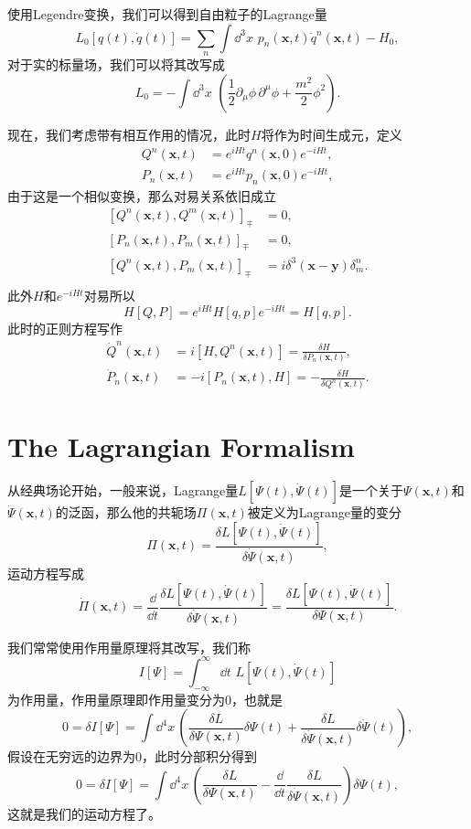 \documentclass[10pt]{extbook}
\theoremstyle{plain}%
\begin{document}
使用Legendre变换，我们可以得到自由粒子的Lagrange量
\[
	L_0[q(t),\dot{q}(t)]=\sum_n \int \dd^3 x\,\,p_n(\mathbf{x},t) \dot{q}^n(\mathbf{x},t)-H_0,
\]
对于实的标量场，我们可以将其改写成
\[
	L_0=-\int \dd^3 x\,\,\left(\frac{1}{2}\partial_\mu\phi\,\partial^\mu\phi+\frac{m^2}{2}\phi^2\right).
\]

现在，我们考虑带有相互作用的情况，此时$H$将作为时间生成元，定义
\[
	\begin{split}
	Q^n(\mathbf{x},t)&=e^{iHt}q^n(\mathbf{x},0)e^{-iHt},\\
	P_n(\mathbf{x},t)&=e^{iHt}p_n(\mathbf{x},0)e^{-iHt},
	\end{split}
\]
由于这是一个相似变换，那么对易关系依旧成立
\[
	\begin{split}
		[Q^n(\mathbf{x},t),Q^m(\mathbf{x},t)]_{\mp}&=0,\\
		[P_n(\mathbf{x},t),P_m(\mathbf{x},t)]_{\mp}&=0,\\
		[Q^n(\mathbf{x},t),P_m(\mathbf{x},t)]_{\mp}&=i\delta^3(\mathbf{x}-\mathbf{y})\delta^n_m.\\
	\end{split}
\]
此外$H$和$e^{-iHt}$对易所以
\[
H[Q,P]=e^{iHt}H[q,p]e^{-iHt}=H[q,p].
\]
此时的正则方程写作
\[
\begin{split}
	\dot{Q}^n(\mathbf{x},t)&=i[H,Q^n(\mathbf{x},t)]=\frac{\delta H}{\delta P_n(\mathbf{x},t)},\\
	\dot{P}_n(\mathbf{x},t)&=-i[P_n(\mathbf{x},t),H]=-\frac{\delta H}{\delta Q^n(\mathbf{x},t)}.
\end{split}
\]
\section{The Lagrangian Formalism}
从经典场论开始，一般来说，Lagrange量$L[\Psi(t),\dot{\Psi}(t)]$是一个关于$\Psi(\mathbf{x},t)$和$\dot{\Psi}(\mathbf{x},t)$的泛函，那么他的共轭场$\Pi(\mathbf{x},t)$被定义为Lagrange量的变分
\[
	\Pi(\mathbf{x},t)=\frac{\delta L[\Psi(t),\dot{\Psi}(t)]}{\delta \dot{\Psi}(\mathbf{x},t)},
\]
运动方程写成
\[
	\dot{\Pi}(\mathbf{x},t)=\frac{\dd}{\dd t}\frac{\delta L[\Psi(t),\dot{\Psi}(t)]}{\delta \dot{\Psi}(\mathbf{x},t)}=\frac{\delta L[\Psi(t),\dot{\Psi}(t)]}{\delta \Psi(\mathbf{x},t)}.
\]

我们常常使用作用量原理将其改写，我们称
\[
	I[\Psi]=\int_{-\infty}^\infty \dd t\,\, L[\Psi(t),\dot{\Psi}(t)]
\]
为作用量，作用量原理即作用量变分为0，也就是
\[
	0=\delta I[\Psi]=\int \dd^4x\,\left(\frac{\delta L}{\delta \Psi(\mathbf{x},t)}\delta \Psi(t)+\frac{\delta L}{\delta \dot{\Psi}(\mathbf{x},t)}\delta\dot{\Psi}(t)\right),
\]
假设在无穷远的边界为0，此时分部积分得到
\[
	0=\delta I[\Psi]=\int \dd^4x\,\left(\frac{\delta L}{\delta \Psi(\mathbf{x},t)}-\frac{\dd}{\dd t}\frac{\delta L}{\delta \dot{\Psi}(\mathbf{x},t)}\right)\delta \Psi(t),
\]
这就是我们的运动方程了。
\end{document}
